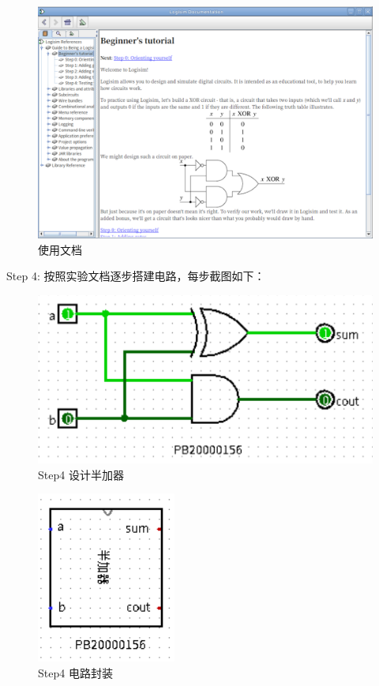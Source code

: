 \documentclass[UTF8]{ctexart}
\begin{document}
\begin{figure}[h!]
    \centering
    \includegraphics[scale=0.6]{tutor.PNG}
    \caption{使用文档}
\end{figure}
\newline
Step 4:
\newline
按照实验文档逐步搭建电路，每步截图如下：
\begin{figure}[h!]
    \centering
    \includegraphics[scale=0.6]{S4_1.PNG}
    \caption{Step4 设计半加器}
\end{figure}
\begin{figure}[h!]
    \centering
    \includegraphics[scale=0.6]{S4_2.PNG}
    \caption{Step4 电路封装}
\end{figure}
\end{document}
